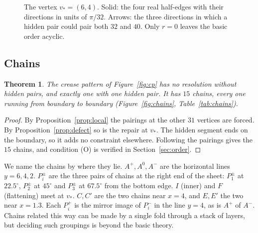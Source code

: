\documentclass[11pt]{article}
\newtheorem{theorem}{Theorem}
\theoremstyle{definition}
\theoremstyle{remark}
\newcommand{\vstar}{v_\ast}
\begin{document}
\begin{figure}[t]
\centering
{}
\caption{The vertex $\vstar=(6,4)$. Solid: the four real half-edges with their directions in units of $\pi/32$. Arrows: the three directions in which a hidden pair could pair both $32$ and $40$. Only $r=0$ leaves the basic order acyclic.}
\label{fig:vstar}
\end{figure}

\subsection{Chains}

\begin{theorem}\label{thm:chains}
The crease pattern of Figure~\ref{fig:cp} has no resolution without hidden pairs, and exactly one with one hidden pair. It has $15$ chains, every one running from boundary to boundary (Figure~\ref{fig:chains}, Table~\ref{tab:chains}).
\end{theorem}
\begin{proof}
By Proposition~\ref{prop:local} the pairings at the other $31$ vertices are forced. By Proposition~\ref{prop:defect} so is the repair at $\vstar$. The hidden segment ends on the boundary, so it adds no constraint elsewhere. Following the pairings gives the $15$ chains, and condition (O) is verified in Section~\ref{sec:order}.
\end{proof}

We name the chains by where they lie. $A^{+},A^{0},A^{-}$ are the horizontal lines $y=6,4,2$. $P_i^{\pm}$ are the three pairs of chains at the right end of the sheet: $P_1^{\pm}$ at $22.5^\circ$, $P_2^{\pm}$ at $45^\circ$ and $P_3^{\pm}$ at $67.5^\circ$ from the bottom edge. $I$ (inner) and $F$ (flattening) meet at $\vstar$. $C,C'$ are the two chains near $x=4$, and $E,E'$ the two near $x=1.3$. Each $P_i^{+}$ is the mirror image of $P_i^{-}$ in the line $y=4$, as is $A^{+}$ of $A^{-}$. Chains related this way can be made by a single fold through a stack of layers, but deciding such groupings is beyond the basic theory.
\end{document}
